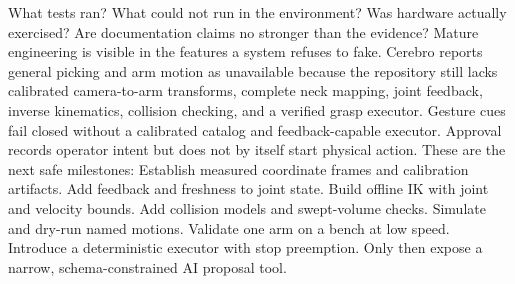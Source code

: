 \markdownRendererUlEnd \markdownRendererInterblockSeparator
{}
\markdownRendererSectionEnd \markdownRendererSectionBegin
{}\markdownRendererInterblockSeparator
{}\markdownRendererUlBegin
\markdownRendererUlItem What tests ran?\markdownRendererUlItemEnd 
\markdownRendererUlItem What could not run in the environment?\markdownRendererUlItemEnd 
\markdownRendererUlItem Was hardware actually exercised?\markdownRendererUlItemEnd 
\markdownRendererUlItem Are documentation claims no stronger than the evidence?\markdownRendererUlItemEnd 
\markdownRendererUlEnd \markdownRendererInterblockSeparator
{}\markdownRendererThematicBreak{}\markdownRendererInterblockSeparator
{}
\markdownRendererSectionEnd 
\markdownRendererSectionEnd \markdownRendererSectionBegin
{}\markdownRendererInterblockSeparator
{}Mature engineering is visible in the features a system refuses to fake.\markdownRendererSoftLineBreak
{}Cerebro reports general picking and arm motion as unavailable because the\markdownRendererSoftLineBreak
{}repository still lacks calibrated camera-to-arm transforms, complete neck\markdownRendererSoftLineBreak
{}mapping, joint feedback, inverse kinematics, collision checking, and a verified\markdownRendererSoftLineBreak
{}grasp executor. Gesture cues fail closed without a calibrated catalog and\markdownRendererSoftLineBreak
{}feedback-capable executor. Approval records operator intent but does not by\markdownRendererSoftLineBreak
{}itself start physical action.\markdownRendererParagraphSeparator
{}These are the next safe milestones:\markdownRendererInterblockSeparator
{}\markdownRendererOlBegin
{}Establish measured coordinate frames and calibration artifacts.\markdownRendererOlItemEnd 
{}Add feedback and freshness to joint state.\markdownRendererOlItemEnd 
{}Build offline IK with joint and velocity bounds.\markdownRendererOlItemEnd 
{}Add collision models and swept-volume checks.\markdownRendererOlItemEnd 
{}Simulate and dry-run named motions.\markdownRendererOlItemEnd 
{}Validate one arm on a bench at low speed.\markdownRendererOlItemEnd 
{}Introduce a deterministic executor with stop preemption.\markdownRendererOlItemEnd 
{}Only then expose a narrow, schema-constrained AI proposal tool.\markdownRendererOlItemEnd 
